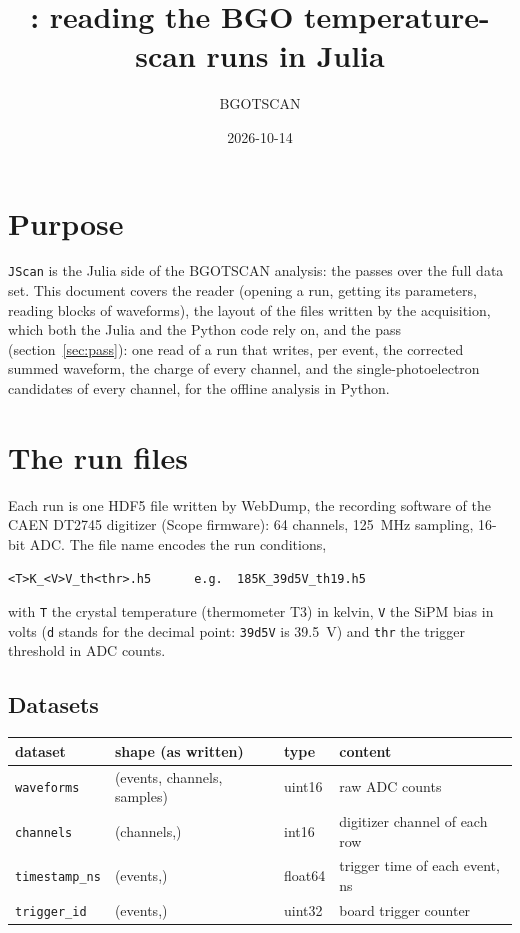\documentclass[11pt]{article}
\title{\code{JScan}: reading the BGO temperature-scan runs in Julia}
\author{BGOTSCAN}
\date{2026-10-14}
\newcommand{\code}[1]{\texttt{#1}}
\begin{document}
\maketitle

\section{Purpose}

\code{JScan} is the Julia side of the BGOTSCAN analysis: the passes over the
full data set. This document covers the reader (opening a run, getting its
parameters, reading blocks of waveforms), the layout of the files written by
the acquisition, which both the Julia and the Python code rely on, and the
pass (section~\ref{sec:pass}): one read of a run that writes, per event, the
corrected summed waveform, the charge of every channel, and the
single-photoelectron candidates of every channel, for the offline analysis in
Python.

\section{The run files}

Each run is one HDF5 file written by WebDump, the recording software of the
CAEN DT2745 digitizer (Scope firmware): 64 channels, 125~MHz sampling, 16-bit
ADC. The file name encodes the run conditions,
\begin{lstlisting}
<T>K_<V>V_th<thr>.h5      e.g.  185K_39d5V_th19.h5
\end{lstlisting}
with \code{T} the crystal temperature (thermometer T3) in kelvin, \code{V} the
SiPM bias in volts (\code{d} stands for the decimal point: \code{39d5V} is
39.5~V) and \code{thr} the trigger threshold in ADC counts.

\subsection{Datasets}

\begin{center}
\begin{tabular}{llll}
\toprule
dataset & shape (as written) & type & content \\
\midrule
\code{waveforms}    & (events, channels, samples) & uint16  & raw ADC counts \\
\code{channels}     & (channels,)                 & int16   & digitizer channel of each row \\
\code{timestamp\_ns} & (events,)                  & float64 & trigger time of each event, ns \\
\code{trigger\_id}  & (events,)                   & uint32  & board trigger counter \\
\bottomrule
\end{tabular}
\end{center}
\end{document}
